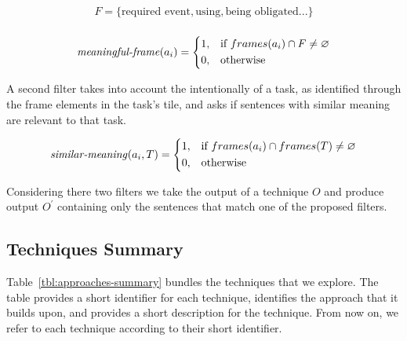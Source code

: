 \begin{equation}
\begin{split}
F = \{ \text{required event}, \text{using}, \text{being obligated} ... \} \\
\end{split}
\end{equation}


\begin{equation}
\text{\textit{meaningful-frame}}(a_i) = \left \{
\begin{aligned}
    &1, && \text{if}\ frames(a_i) \cap F \ne \emptyset \\
    &0, && \text{otherwise}
\end{aligned} \right.
\end{equation} 


\smallskip
A second filter takes into account the intentionally of a task, as identified through the frame elements in the task's tile, and asks if sentences with similar meaning are relevant to that task. 


\begin{equation}
\text{\textit{similar-meaning}}(a_i, T) = \left \{
\begin{aligned}
    &1, && \text{if}\ frames(a_i) \cap frames(T) \ne \emptyset \\
    &0, && \text{otherwise}
\end{aligned} \right.
\end{equation} 



Considering there two filters we take the output of a technique $O$ and produce output $O^{\prime}$ containing only the sentences that match one of the proposed filters.



\subsection{Techniques Summary}


Table~\ref{tbl:approaches-summary} bundles the techniques that we explore.
The table provides a short identifier for each technique, identifies the approach that it builds upon, and provides a short description for the technique. From now on, we refer to each technique according to their short identifier.


